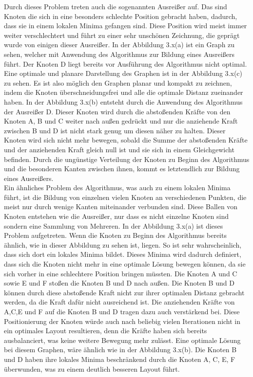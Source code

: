  Durch dieses Problem treten auch die sogenannten Ausreißer auf. Das sind Knoten die sich in eine besonders schlechte Position gebracht haben, dadurch, dass sie in einem lokalen Minima gefangen sind. Diese Position wird meist immer weiter verschlechtert und führt zu einer sehr unschönen Zeichnung, die geprägt wurde von einigen dieser Ausreißer. In der Abbildung 3.x(a) ist ein Graph zu sehen, welcher mit Anwendung des Algorithmus zur Bildung eines Ausreißers führt. Der Knoten D liegt bereits vor Ausführung des Algorithmus nicht optimal. Eine optimale und planare Darstellung des Graphen ist in der Abbildung 3.x(c) zu sehen. Es ist also möglich den Graphen planar und kompakt zu zeichnen, indem die Knoten überschneidungsfrei und alle die optimale Distanz zueinander haben. In der Abbildung 3.x(b) entsteht durch die Anwendung des Algorithmus der Ausreißer D. Dieser Knoten wird durch die abstoßenden Kräfte von den Knoten A, B und C weiter nach außen gedrückt und nur die anziehende Kraft zwischen B und D ist nicht stark genug um diesen näher zu halten. Dieser Knoten wird sich nicht mehr bewegen, sobald die Summe der abstoßenden Kräfte und der anziehenden Kraft gleich null ist und sie sich in einem Gleichgewicht befinden. Durch die ungünstige Verteilung der Knoten zu Beginn des Algorithmus und die besonderen Kanten zwischen ihnen, kommt es letztendlich zur Bildung eines Ausreißers. \\ 
 
 Ein ähnliches Problem des Algorithmus, was auch zu einem lokalen Minima führt, ist die Bildung von einzelnen vielen Knoten an verschiedenen Punkten, die meist nur durch wenige Kanten miteinander verbunden sind. Diese Ballen von Knoten entstehen wie die Ausreißer, nur dass es nicht einzelne Knoten sind sondern eine Sammlung von Mehreren. In der Abbildung 3.x(a) ist dieses Problem aufgetreten. Wenn die Knoten zu Beginn des Algorithmus bereits ähnlich, wie in dieser Abbildung zu sehen ist, liegen. So ist sehr wahrscheinlich, dass sich dort ein lokales Minima bildet. Dieses Minima wird dadurch definiert, dass sich die Knoten nicht mehr in eine optimale Lösung bewegen können, da sie sich vorher in eine schlechtere Position bringen müssten. Die Knoten A und C sowie E und F stoßen die Knoten B und D nach außen. Die Knoten B und D können durch diese abstoßende Kraft nicht zur ihrer optimalen Distanz gebracht werden, da die Kraft dafür nicht ausreichend ist. Die anziehenden Kräfte von A,C,E und F auf die Knoten B und D tragen dazu auch verstärkend bei. Diese Positionierung der Knoten würde auch nach beliebig vielen Iterationen nicht in ein optimales Layout resultieren, denn die Kräfte haben sich bereits ausbalanciert, was keine weitere Bewegung mehr zulässt. Eine optimale Lösung bei diesem Graphen, wäre ähnlich wie in der Abbildung 3.x(b). Die Knoten B und D haben ihre lokales Minima beschränkend durch die Knoten A, C, E, F überwunden, was zu einem deutlich besseren Layout führt.  \\
 
